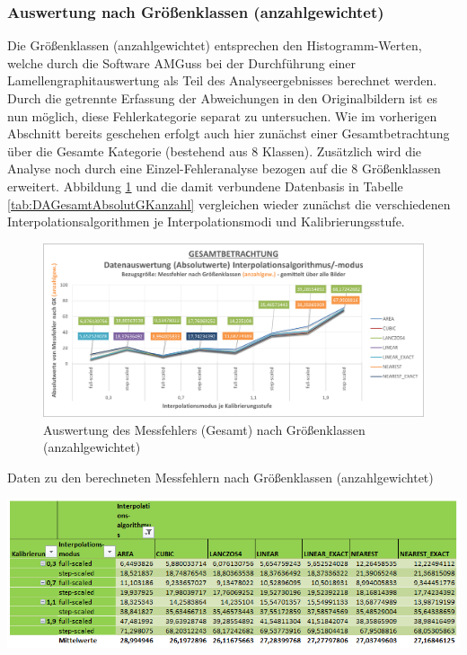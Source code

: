 \documentclass[
fontsize=10pt, 
listof = totoc,
parskip = half	
]{report}
\begin{document}
\subsubsection{Auswertung nach Größenklassen (anzahlgewichtet)}
\label{subsubsec:AuswertungGKanz}
Die Größenklassen (anzahlgewichtet) entsprechen den Histogramm-Werten, welche durch die Software AMGuss bei der Durchführung einer Lamellengraphitauswertung als Teil des Analyseergebnisses berechnet werden. Durch die getrennte Erfassung der Abweichungen in den Originalbildern ist es nun möglich, diese Fehlerkategorie separat zu untersuchen. Wie im vorherigen Abschnitt bereits geschehen erfolgt auch hier zunächst einer Gesamtbetrachtung über die Gesamte Kategorie (bestehend aus 8 Klassen). Zusätzlich wird die Analyse noch durch eine Einzel-Fehleranalyse bezogen auf die 8 Größenklassen erweitert. Abbildung \ref{fig:DAGesamtAbsolutGKanzahl} und die damit verbundene Datenbasis in Tabelle \ref{tab:DAGesamtAbsolutGKanzahl} vergleichen wieder zunächst die verschiedenen Interpolationsalgorithmen je Interpolationsmodi und Kalibrierungsstufe.

\begin{figure}[H]
	\centering
	\includegraphics[width=\textwidth, height=\textheight, keepaspectratio]{pics/DA_Gesamt_Absolut_GKanzahl}
	\caption{Auswertung des Messfehlers (Gesamt) nach Größenklassen (anzahlgewichtet)}
	\label{fig:DAGesamtAbsolutGKanzahl}
\end{figure}

\begin{table}[H]
	\centering
	\caption{Daten zu den berechneten Messfehlern nach Größenklassen (anzahlgewichtet)}
	\label{tab:DAGesamtAbsolutGKanzahl}
	\includegraphics[width=\textwidth, height=\textheight, keepaspectratio]{pics/Tab_DA_Gesamt_Absolut_GKanzahl}
\end{table}
\end{document}
